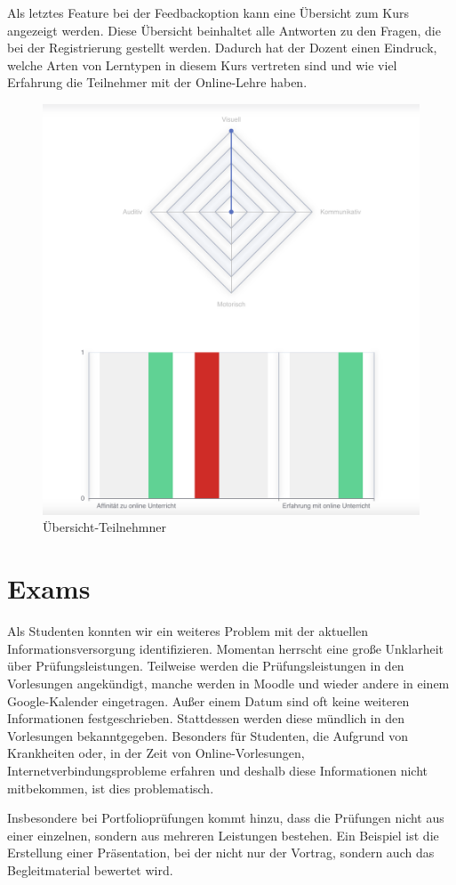 Als letztes Feature bei der Feedbackoption kann eine Übersicht zum Kurs angezeigt werden. Diese Übersicht beinhaltet alle Antworten zu den Fragen, die 
bei der Registrierung gestellt werden. Dadurch hat der Dozent einen Eindruck, welche Arten von Lerntypen in diesem Kurs vertreten sind und wie viel 
Erfahrung die Teilnehmer mit der Online-Lehre haben. 
\begin{figure}[!h] 
    \centering
    \includegraphics[width=.7\textwidth]{img/Feedback_uebersicht_Teilnehmer.png}
    \caption{Übersicht-Teilnehmner}
    \label{fig:uebersichtTeilnehmner}
\end{figure}

\section{Exams}
Als Studenten konnten wir ein weiteres Problem mit der aktuellen Informationsversorgung identifizieren.
Momentan herrscht eine große Unklarheit über Prüfungsleistungen.
Teilweise werden die Prüfungsleistungen in den Vorlesungen angekündigt, manche werden in Moodle und wieder andere in einem Google-Kalender eingetragen. Außer einem Datum sind oft keine weiteren Informationen festgeschrieben. Stattdessen werden diese mündlich in den Vorlesungen bekanntgegeben.
Besonders für Studenten, die Aufgrund von Krankheiten oder, in der Zeit von Online-Vorlesungen, Internetverbindungsprobleme erfahren und deshalb diese Informationen nicht mitbekommen, ist dies problematisch.

Insbesondere bei Portfolioprüfungen kommt hinzu, dass die Prüfungen nicht aus einer einzelnen, sondern aus mehreren Leistungen bestehen.
Ein Beispiel ist die Erstellung einer Präsentation, bei der nicht nur der Vortrag, sondern auch das Begleitmaterial bewertet wird.


